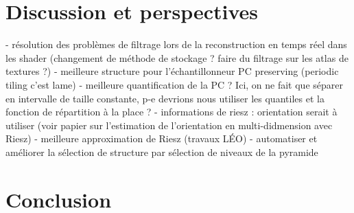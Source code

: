 \Conclusion \label{chap:conclusion}



\section{Discussion et perspectives}

- résolution des problèmes de filtrage lors de la reconstruction en temps réel dans les shader (changement de méthode de stockage ? faire du filtrage sur les atlas de textures ?)
- meilleure structure pour l'échantillonneur PC preserving (periodic tiling c'est lame)
- meilleure quantification de la PC ? Ici, on ne fait que séparer en intervalle de taille constante, p-e devrions nous utiliser les quantiles et la fonction de répartition à la place ?
- informations de riesz : orientation serait à utiliser (voir papier sur l'estimation de l'orientation en multi-didmension avec Riesz)
- meilleure approximation de Riesz (travaux LÉO)
- automatiser et améliorer la sélection de structure par sélection de niveaux de la pyramide


\section{Conclusion}
